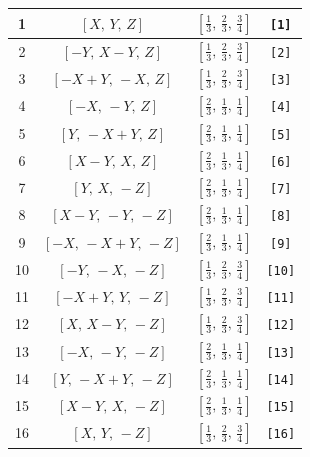 \documentclass[fleqn,8pt]{jsarticle}
\begin{document}
\begin{longtable}{cccc}
1 & $\left[ X,\, Y,\, Z \right]$ & $\left[ \frac{1}{3},\, \frac{2}{3},\, \frac{3}{4} \right]$ & {\tt [1]} \\ \hline
2 & $\left[ - Y,\, X - Y,\, Z \right]$ & $\left[ \frac{1}{3},\, \frac{2}{3},\, \frac{3}{4} \right]$ & {\tt [2]} \\ \hline
3 & $\left[ - X + Y,\, - X,\, Z \right]$ & $\left[ \frac{1}{3},\, \frac{2}{3},\, \frac{3}{4} \right]$ & {\tt [3]} \\ \hline
4 & $\left[ - X,\, - Y,\, Z \right]$ & $\left[ \frac{2}{3},\, \frac{1}{3},\, \frac{1}{4} \right]$ & {\tt [4]} \\ \hline
5 & $\left[ Y,\, - X + Y,\, Z \right]$ & $\left[ \frac{2}{3},\, \frac{1}{3},\, \frac{1}{4} \right]$ & {\tt [5]} \\ \hline
6 & $\left[ X - Y,\, X,\, Z \right]$ & $\left[ \frac{2}{3},\, \frac{1}{3},\, \frac{1}{4} \right]$ & {\tt [6]} \\ \hline
7 & $\left[ Y,\, X,\, - Z \right]$ & $\left[ \frac{2}{3},\, \frac{1}{3},\, \frac{1}{4} \right]$ & {\tt [7]} \\ \hline
8 & $\left[ X - Y,\, - Y,\, - Z \right]$ & $\left[ \frac{2}{3},\, \frac{1}{3},\, \frac{1}{4} \right]$ & {\tt [8]} \\ \hline
9 & $\left[ - X,\, - X + Y,\, - Z \right]$ & $\left[ \frac{2}{3},\, \frac{1}{3},\, \frac{1}{4} \right]$ & {\tt [9]} \\ \hline
10 & $\left[ - Y,\, - X,\, - Z \right]$ & $\left[ \frac{1}{3},\, \frac{2}{3},\, \frac{3}{4} \right]$ & {\tt [10]} \\ \hline
11 & $\left[ - X + Y,\, Y,\, - Z \right]$ & $\left[ \frac{1}{3},\, \frac{2}{3},\, \frac{3}{4} \right]$ & {\tt [11]} \\ \hline
12 & $\left[ X,\, X - Y,\, - Z \right]$ & $\left[ \frac{1}{3},\, \frac{2}{3},\, \frac{3}{4} \right]$ & {\tt [12]} \\ \hline
13 & $\left[ - X,\, - Y,\, - Z \right]$ & $\left[ \frac{2}{3},\, \frac{1}{3},\, \frac{1}{4} \right]$ & {\tt [13]} \\ \hline
14 & $\left[ Y,\, - X + Y,\, - Z \right]$ & $\left[ \frac{2}{3},\, \frac{1}{3},\, \frac{1}{4} \right]$ & {\tt [14]} \\ \hline
15 & $\left[ X - Y,\, X,\, - Z \right]$ & $\left[ \frac{2}{3},\, \frac{1}{3},\, \frac{1}{4} \right]$ & {\tt [15]} \\ \hline
16 & $\left[ X,\, Y,\, - Z \right]$ & $\left[ \frac{1}{3},\, \frac{2}{3},\, \frac{3}{4} \right]$ & {\tt [16]} \\ \hline

\end{longtable}
\end{document}
